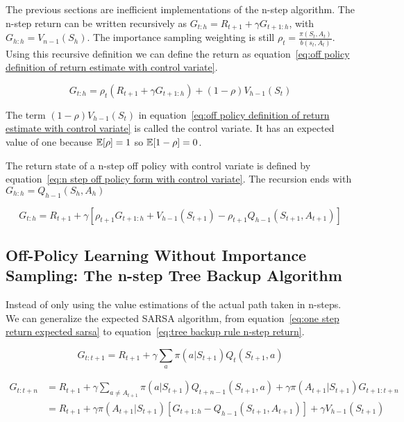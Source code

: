 The previous sections are inefficient implementations of the n-step algorithm. The n-step return can be written recursively as $G_{t:h} = R_{t+1} + \gamma G_{t+1:h}$, with $G_{h:h}=V_{n-1}(S_h)$. The importance sampling weighting is still $\rho_t = \frac{\pi(S_t, A_t)}{b(s_t, A_t)}$. Using this recursive definition we can define the return as equation~\ref{eq:off policy definition of return estimate with control variate}.

\begin{equation}
G_{t:h} = \rho_t(R_{t+1} + \gamma G_{t+1:h}) + (1-\rho) V_{h-1}(S_t)
\label{eq:off policy definition of return estimate with control variate}
\end{equation}

The term $(1-\rho) V_{h-1}(S_t)$ in equation~\ref{eq:off policy definition of return estimate with control variate} is called the control variate. It has an expected value of one because $\operatorname{\mathbb{E}}[\rho]=1$ so $\operatorname{\mathbb{E}}[1-\rho]=0$.

The return state of a n-step off policy with control variate is defined by equation~\ref{eq:n step off policy form with control variate}. The recursion ends with $G_{h:h}=Q_{h-1}(S_h, A_h)$

\begin{equation}
G_{t:h} = R_{t+1} + \gamma [ \rho_{t+1} G_{t+1:h} + V_{h-1}(S_{t+1})-\rho_{t+1}Q_{h-1}(S_{t+1}, A_{t+1})]
\label{eq:n step off policy form with control variate}
\end{equation}


\subsection{Off-Policy Learning Without Importance Sampling: The n-step Tree Backup Algorithm}

Instead of only using the value estimations of the actual path taken in n-steps. We can generalize the expected SARSA algorithm, from equation~\ref{eq:one step return expected sarsa} to equation~\ref{eq:tree backup rule n-step return}. 

\begin{equation}
G_{t:t+1} = R_{t+1} + \gamma \sum_{a} \pi (a | S_{t+1})Q_t(S_{t+1}, a)
\label{eq:one step return expected sarsa}
\end{equation}

\begin{equation}
\begin{split}
G_{t:t+n} & = R_{t+1} + \gamma \sum_{a \neq A_{t+1}} \pi (a|S_{t+1})Q_{t+n-1}(S_{t+1},a) + \gamma \pi(A_{t+1}|S_{t+1})G_{t+1:t+n} \\
& = R_{t+1} + \gamma \pi (A_{t+1}| S_{t+1}) [G_{t+1:h}-Q_{h-1}(S_{t+1}, A_{t+1})] + \gamma V_{h-1} (S_{t+1})
\label{eq:tree backup rule n-step return}
\end{split}
\end{equation}

